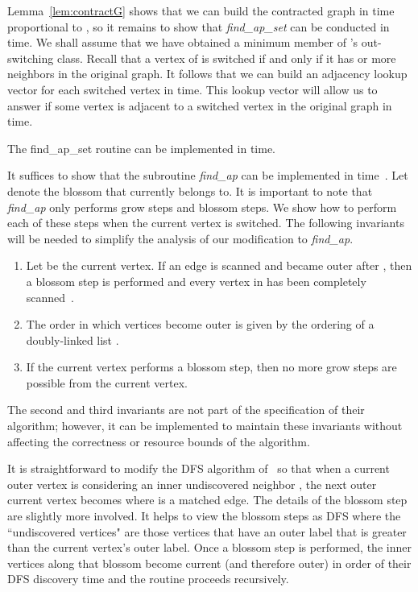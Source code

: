 \documentclass{llncs}
\begin{document}
Lemma~\ref{lem:contractG} shows that we can build the contracted graph in time proportional to , so it remains to show that \emph{find\_ap\_set} can be conducted in  time.  We shall assume that we have obtained a minimum member  of 's out-switching class.  Recall that a vertex of  is switched if and only if it has  or more neighbors in the original graph.  It follows that we can build an adjacency lookup vector  for each switched vertex  in  time.  This lookup vector will allow us to answer if some vertex  is adjacent to a switched vertex  in the original graph in  time. 

\begin{lemma}
The find\_ap\_set routine can be implemented in  time.
\end{lemma}

\noindent It suffices to show that the subroutine \emph{find\_ap} can be implemented in  time~\cite{GabowT91}.  Let  denote the blossom that  currently belongs to.  It is important to note that \emph{find\_ap} only performs grow steps and blossom steps.  We show how to perform each of these steps when the current vertex is switched.  The following invariants will be needed to simplify the analysis of our modification to \emph{find\_ap}.

\begin{enumerate}
\item Let  be the current vertex. If an edge  is scanned and  became outer after , then a blossom step is performed and every vertex in  has been completely scanned~\cite{GabowT91}.
\item The order in which vertices become outer is given by the ordering of a doubly-linked list .
\item If the current vertex performs a blossom step, then no more grow steps are possible from the current vertex.
\end{enumerate}
The second and third invariants are not part of the specification of their algorithm; however, it can be implemented to maintain these invariants without affecting the correctness or resource bounds of the algorithm. 

It is straightforward to modify the DFS algorithm of~\cite{LindzeyO13} so that when a current outer vertex  is considering an inner undiscovered neighbor , the next outer current vertex becomes  where  is a matched edge.  The details of the blossom step are slightly more involved.  It helps to view the blossom steps as DFS where the ``undiscovered vertices" are those vertices that have an outer label that is greater than the current vertex's outer label.  Once a blossom step is performed, the inner vertices along that blossom become current (and therefore outer) in order of their DFS discovery time and the routine proceeds recursively.
\end{document}
